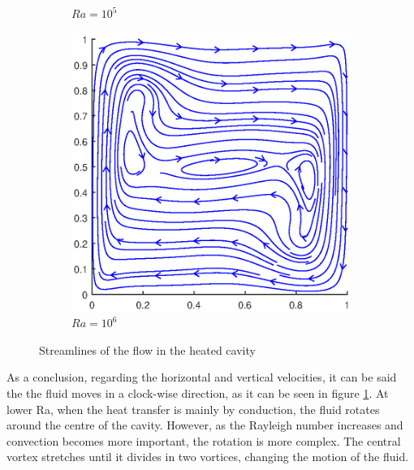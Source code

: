 \begin{figure}[h]
\begin{subfigure}{0.5\textwidth}
		\caption{$Ra=10^{5}$}
	\end{subfigure}%
	\begin{subfigure}{0.5\textwidth}
		\includegraphics[scale=0.61]{Buoyancy/6}
		\caption{$Ra=10^{6}$}
	\end{subfigure}
	\caption{Streamlines of the flow in the heated cavity}
	\label{HeatedStreamlines}
\end{figure}

As a conclusion, regarding the horizontal and vertical velocities, it can be said the the fluid moves in a clock-wise direction, as it can be seen in figure \ref{HeatedStreamlines}. At lower Ra, when the heat transfer is mainly by conduction, the fluid rotates around the centre of the cavity. However, as the Rayleigh number increases and convection becomes more important, the rotation is more complex. The central vortex stretches until it divides in two vortices, changing the motion of the fluid.

